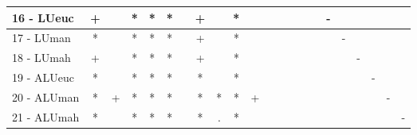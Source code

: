 \begin{table}[h]
\begin{center}
\begin{tabular}{lcc|cc|cc|cc|cc|cc|cc|cc|cc|cc|c}
16 - LUeuc	& + &   & * & * & * &   & + &   & * &   &   &   &   &   &   & - &   &   &   &   &   \\ \hline
17 - LUman	& * &   & * & * & * &   & + &   & * &   &   &   &   &   &   &   & - &   &   &   &   \\
18 - LUmah	& + &   & * & * & * &   & + &   & * &   &   &   &   &   &   &   &   & - &   &   &   \\ \hline
19 - ALUeuc	& * &   & * & * & * &   & * &   & * &   &   &   &   &   &   &   &   &   & - &   &   \\
20 - ALUman	& * & + & * & * & * &   & * & * & * & + &   &   &   &   &   &   &   &   &   & - &   \\ \hline
21 - ALUmah	& * &   & * & * & * &   & * & . & * &   &   &   &   &   &   &   &   &   &   &   & - \\\end{tabular}
\label{stratsALCKappaFriedbest}
\end{center}
\end{table}
